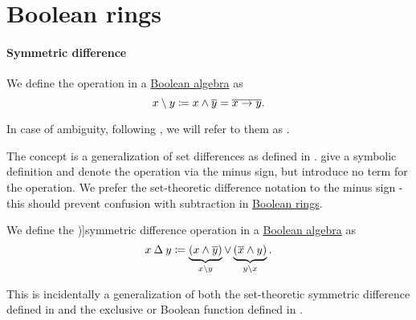 \section{Boolean rings}\label{sec:boolean_rings}

\paragraph{Symmetric difference}

\begin{definition}\label{def:boolean_algebra_difference}
  We define the  operation in a \hyperref[def:boolean_algebra]{Boolean algebra} as
  \begin{equation}\label{eq:def:boolean_algebra_difference}
    x \setminus y \coloneqq x \wedge \oline y = \oline{x \rightarrow y}.
  \end{equation}

  In case of ambiguity, following , we will refer to them as .
\end{definition}
\begin{comments}
  \item The concept is a generalization of set differences as defined in .  give a symbolic definition and denote the operation via the minus sign, but introduce no term for the operation. We prefer the set-theoretic difference notation to the minus sign - this should prevent confusion with subtraction in \hyperref[def:boolean_ring]{Boolean rings}.
\end{comments}

\begin{definition}\label{def:symmetric_difference}
  We define the \term[ru=симметрическая разность (\cite[\S 2.1.5]{КусраевКутателадзе2005БулевозначныйАнализ})]{symmetric difference} operation in a \hyperref[def:boolean_algebra]{Boolean algebra} as
  \begin{equation}\label{eq:def:symmetric_difference}
    x \symdiff y \coloneqq \underbrace{(x \wedge \oline y)}_{x \setminus y} \vee \underbrace{(\oline x \wedge y)}_{y \setminus x}.
  \end{equation}
\end{definition}
\begin{comments}
  \item This is incidentally a generalization of both the set-theoretic symmetric difference defined in  and the exclusive or Boolean function defined in .
\end{comments}

